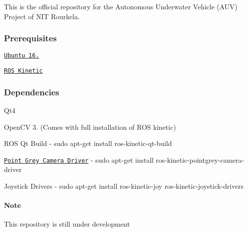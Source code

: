 This is the official repository for the Autonomous Underwater Vehicle (A\+UV) Project of N\+IT Rourkela.

\subsubsection*{Prerequisites}


\begin{DoxyItemize}
\item \href{http://releases.ubuntu.com/16.04/}{\tt Ubuntu 16.}
\item \href{http://wiki.ros.org/kinetic}{\tt R\+OS Kinetic}
\end{DoxyItemize}

\subsubsection*{Dependencies}


\begin{DoxyItemize}
\item Qt4
\item Open\+CV 3. (Comes with full installation of R\+OS kinetic)
\item R\+OS Qt Build -\/ {\ttfamily sudo apt-\/get install ros-\/kinetic-\/qt-\/build}
\item \href{http://wiki.ros.org/pointgrey_camera_driver}{\tt Point Grey Camera Driver} -\/ {\ttfamily sudo apt-\/get install ros-\/kinetic-\/pointgrey-\/camera-\/driver}
\item Joystick Drivers -\/ {\ttfamily sudo apt-\/get install ros-\/kinetic-\/joy ros-\/kinetic-\/joystick-\/drivers}
\end{DoxyItemize}

\paragraph*{Note}

This repository is still under development 